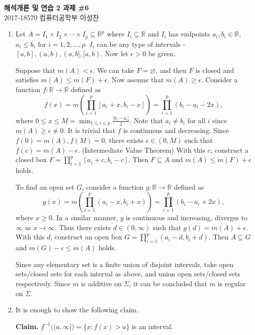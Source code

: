\documentclass[12pt]{report}
\newcommand{\numl}[1]{\item[\large\textbf{\sffamily #1.}]}
\newcommand{\inv}{^{-1}}
\renewcommand{\subset}{\subseteq}
\newcommand{\abs}[1]{\left| #1 \right|}
\newcommand{\paren}[1]{\left( #1 \right)}
\newcommand{\ra}{\rightarrow}
\newcommand{\R}{\mathbb{R}}
\begin{document}
\begin{center}
    \textbf{\Large 해석개론 및 연습 2 과제 \#6}\\
    \large 2017-18570 컴퓨터공학부 이성찬
\end{center}
\begin{enumerate}

    \numl{1} Let \(A = I_1 \times I_2 \times \cdots \times I_p \subset \R^p\) where \(I_i \subset \R\) and \(I_i\) has endpoints \(a_i, b_i \in \R\), \(a_i \leq b_i\) for \(i = 1, 2, \dots, p\). \(I_i\) can be any type of intervals - \([a, b], (a, b), (a, b], [a, b)\). Now let \(\epsilon > 0\) be given.

    Suppose that \(m(A) < \epsilon\). We can take \(F = \varnothing\), and then \(F\) is closed and satisfies \(m(A) \leq m(F) + \epsilon\). Now assume that \(m(A) \geq \epsilon\). Consider a function \(f: \R \ra \R\) defined as
    \[
        f(x) = m\paren{\prod_{i=1}^p [a_i + x, b_i - x]} = \prod_{i=1}^p (b_i - a_i - 2x),
    \]
    where \(0 \leq x \leq M = \min_{1 \leq i \leq p} \frac{\abs{b_i - a_i}}{2}\). Note that \(a_i \neq b_i\) for all \(i\) since \(m(A) \geq \epsilon \neq 0\). It is trivial that \(f\) is continuous and decreasing. Since \(f(0) = m(A), f(M) = 0\), there exists \(c \in (0, M)\) such that \(f(c) = m(A) - \epsilon\). (Intermediate Value Theorem) With this \(c\), construct a closed box \(F = \prod_{i=1}^{p} [a_i + c, b_i - c]\). Then \(F \subset A\) and \(m(A) \leq m(F) + \epsilon\) holds.

    To find an open set \(G\), consider a function \(g: \R \ra \R\) defined as
    \[
        g(x) = m\paren{\prod_{i=1}^p (a_i-x, b_i+x)} = \prod_{i=1}^p (b_i - a_i + 2x),
    \]
    where \(x \geq 0\). In a similar manner, \(g\) is continuous and increasing, diverges to \(\infty\) as \(x \ra \infty\). Thus there exists \(d \in (0, \infty)\) such that \(g(d) = m(A) + \epsilon\). With this \(d\), construct an open box \(G = \prod_{i=1}^p (a_i - d, b_i + d)\). Then \(A \subset G\) and \(m(G) - \epsilon \leq m(A)\) holds.

    Since any elementary set is a finite union of disjoint intervals, take open sets/closed sets for each interval as above, and union open sets/closed sets respectively. Since \(m\) is additive on \(\Sigma\), it can be concluded that \(m\) is regular on \(\Sigma\).

    \numl{2} It is enough to show the following claim.

        {\sffamily \bfseries Claim.} \(f\inv\bigl((a, \infty]\bigr) = \{x : f(x) > a\}\) is an interval.


\end{enumerate}
\end{document}
